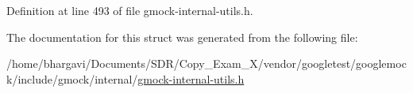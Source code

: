 Definition at line 493 of file gmock-\/internal-\/utils.\+h.



The documentation for this struct was generated from the following file\+:\begin{DoxyCompactItemize}
\item 
/home/bhargavi/\+Documents/\+S\+D\+R/\+Copy\+\_\+\+Exam\+\_\+X/vendor/googletest/googlemock/include/gmock/internal/\hyperlink{gmock-internal-utils_8h}{gmock-\/internal-\/utils.\+h}\end{DoxyCompactItemize}
